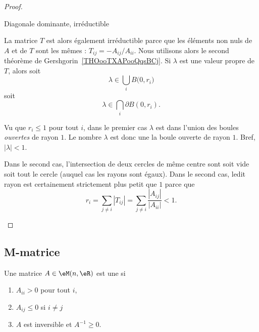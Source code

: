 \begin{proof}
\begin{subproof}
		\item[Diagonale dominante, irréductible]

		La matrice \( T\) est alors également irréductible parce que les éléments non nuls de \( A\) et de \( T\) sont les mêmes : \( T_{ij}=-A_{ij}/A_{ii}\). Nous utilisons alors le second théorème de Gershgorin~\ref{THOooTXAPooQqsBCj}. Si \( \lambda\) est une valeur propre de \( T\), alors soit
		\begin{equation}
			\lambda\in\bigcup_iB\big( 0,r_i \big)
		\end{equation}
		soit
		\begin{equation}
			\lambda\in\bigcap_i\partial B(0,r_i).
		\end{equation}

		Vu que \( r_i\leq 1\) pour tout \( i\), dans le premier cas \( \lambda\) est dans l'union des boules \emph{ouvertes} de rayon \( 1\). Le nombre \( \lambda\) est donc une la boule ouverte de rayon \( 1\). Bref, \( | \lambda |<1\).

		Dans le second cas, l'intersection de deux cercles de même centre sont soit vide soit tout le cercle (auquel cas les rayons sont égaux). Dans le second cas, ledit rayon est certainement strictement plus petit que \( 1\) parce que
		\begin{equation}
			r_i=\sum_{j\neq i}| T_{ij} |=\sum_{j\neq i}\frac{ | A_{ij} | }{ | A_{ii} | }<1.
		\end{equation}
	\end{subproof}
\end{proof}

\subsection{M-matrice}

\begin{definition}      \label{DEFooZAWWooEAujPy}
	Une matrice \( A\in \eM(n,\eR)\) est une  si
	\begin{enumerate}
		\item
		      \( A_{ii}>0\) pour tout \( i\),
		\item
		      \( A_{ij}\leq 0\) si \( i\neq j\)
		\item
		      \( A\) est inversible et \( A^{-1}\geq 0\).
	\end{enumerate}
\end{definition}


